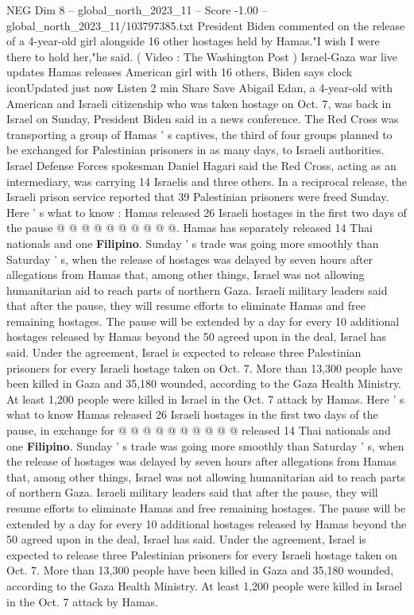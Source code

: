 \begin{textsample}{NEG Dim 8 – global\_north\_2023\_11 – Score -1.00 – global\_north\_2023\_11/103797385.txt}  \label{ex:f8_neg_267}
President Biden commented on the release of a 4-year-old girl alongside 16 other hostages held by Hamas."I wish I were there to hold her,"he said. ( Video : The Washington Post ) Israel-Gaza war live updates Hamas releases American girl with 16 others, Biden says clock iconUpdated just now Listen 2 min Share Save Abigail Edan, a 4-year-old with American and Israeli citizenship who was taken hostage on Oct. 7, was back in Israel on Sunday, President Biden said in a news conference.
The Red Cross was transporting a group of Hamas ' s captives, the third of four groups planned to be exchanged for Palestinian prisoners in as many days, to Israeli authorities.
Israel Defense Forces spokesman Daniel Hagari said the Red Cross, acting as an intermediary, was carrying 14 Israelis and three others.
In a reciprocal release, the Israeli prison service reported that 39 Palestinian prisoners were freed Sunday.
Here ' s what to know : Hamas released 26 Israeli hostages in the first two days of the pause @ @ @ @ @ @ @ @ @ @.
Hamas has separately released 14 Thai nationals and one \textbf{Filipino}.
Sunday ' s trade was going more smoothly than Saturday ' s, when the release of hostages was delayed by seven hours after allegations from Hamas that, among other things, Israel was not allowing humanitarian aid to reach parts of northern Gaza.
Israeli military leaders said that after the pause, they will resume efforts to eliminate Hamas and free remaining hostages.
The pause will be extended by a day for every 10 additional hostages released by Hamas beyond the 50 agreed upon in the deal, Israel has said.
Under the agreement, Israel is expected to release three Palestinian prisoners for every Israeli hostage taken on Oct. 7.
More than 13,300 people have been killed in Gaza and 35,180 wounded, according to the Gaza Health Ministry.
At least 1,200 people were killed in Israel in the Oct. 7 attack by Hamas.
Here ' s what to know Hamas released 26 Israeli hostages in the first two days of the pause, in exchange for @ @ @ @ @ @ @ @ @ @ released 14 Thai nationals and one \textbf{Filipino}.
Sunday ' s trade was going more smoothly than Saturday ' s, when the release of hostages was delayed by seven hours after allegations from Hamas that, among other things, Israel was not allowing humanitarian aid to reach parts of northern Gaza.
Israeli military leaders said that after the pause, they will resume efforts to eliminate Hamas and free remaining hostages.
The pause will be extended by a day for every 10 additional hostages released by Hamas beyond the 50 agreed upon in the deal, Israel has said.
Under the agreement, Israel is expected to release three Palestinian prisoners for every Israeli hostage taken on Oct. 7.
More than 13,300 people have been killed in Gaza and 35,180 wounded, according to the Gaza Health Ministry.
At least 1,200 people were killed in Israel in the Oct. 7 attack by Hamas.

\end{textsample}
